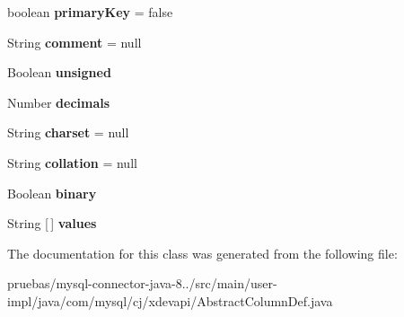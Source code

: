\begin{DoxyCompactItemize}
boolean {\bfseries primary\+Key} = false
\item 
\mbox{\label{classcom_1_1mysql_1_1cj_1_1xdevapi_1_1_abstract_column_def_a21a8d5369ff2d35bd3f744ffeee4fef6}} 
String {\bfseries comment} = null
\item 
\mbox{\label{classcom_1_1mysql_1_1cj_1_1xdevapi_1_1_abstract_column_def_a2196259cc3567816b76588aeb01b90ba}} 
Boolean {\bfseries unsigned}
\item 
\mbox{\label{classcom_1_1mysql_1_1cj_1_1xdevapi_1_1_abstract_column_def_ab14eae5148b99ba2b6d90ccb92f5fa20}} 
Number {\bfseries decimals}
\item 
\mbox{\label{classcom_1_1mysql_1_1cj_1_1xdevapi_1_1_abstract_column_def_a9fe0a018372ddc610696b8ff8c6150f6}} 
String {\bfseries charset} = null
\item 
\mbox{\label{classcom_1_1mysql_1_1cj_1_1xdevapi_1_1_abstract_column_def_a1abcf922d11f6c95966ce2b4e52e9e55}} 
String {\bfseries collation} = null
\item 
\mbox{\label{classcom_1_1mysql_1_1cj_1_1xdevapi_1_1_abstract_column_def_abc425b280afa935ee2a8973bc1d2d85a}} 
Boolean {\bfseries binary}
\item 
\mbox{\label{classcom_1_1mysql_1_1cj_1_1xdevapi_1_1_abstract_column_def_a19e2f7c1bacd7ae112ed78d603b66400}} 
String \mbox{[}$\,$\mbox{]} {\bfseries values}
\end{DoxyCompactItemize}


The documentation for this class was generated from the following file\+:\begin{DoxyCompactItemize}
\item 
pruebas/mysql-\/connector-\/java-\/8../src/main/user-\/impl/java/com/mysql/cj/xdevapi/Abstract\+Column\+Def.\+java\end{DoxyCompactItemize}

